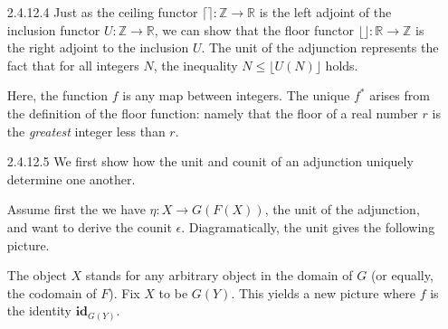 \documentclass{article}
\newcommand{\ccat}{\mathbf{C}}
\newcommand{\dcat}{\mathbf{D}}
\newcommand{\id}{\mathbf{id}}
\newcommand{\ints}{\mathbb{Z}}
\newcommand{\reals}{\mathbb{R}}
\newcommand{\ceil}[1]{\lceil #1 \rceil}
\newcommand{\floor}[1]{\lfloor #1 \rfloor}
\begin{document}
\begin{enumerate}
\vfill{}
\item[2.4.12.4]
  Just as the ceiling functor $\ceil{} : \ints \rightarrow \reals$ is the left adjoint of the inclusion functor $U : \ints \rightarrow \reals$, we can show that the floor functor $\floor{} : \reals \rightarrow \ints$ is the right adjoint to the inclusion $U$.
  The unit of the adjunction represents the fact that for all integers $N$, the inequality $N \le \floor{U(N)}$ holds.
  \begin{center}
  \end{center}
  Here, the function $f$ is any map between integers.
  The unique $f^*$ arises from the definition of the floor function: namely that the floor of a real number $r$ is the \emph{greatest} integer less than $r$.

\vfill{}
\newpage
\item[2.4.12.5]
  We first show how the unit and counit of an adjunction uniquely determine one another.

\subitem
  Assume first the we have $\eta : X \rightarrow G(F(X))$, the unit of the adjunction, and want to derive the counit $\epsilon$.
  Diagramatically, the unit gives the following picture.
  \begin{center}
  \end{center}
\subitem
  The object $X$ stands for any arbitrary object in the domain of $G$ (or equally, the codomain of $F$).
  Fix $X$ to be $G(Y)$.
  This yields a new picture where $f$ is the identity $\id_{G(Y)}$.
  \begin{center}
\end{center}
\end{enumerate}
\end{document}
